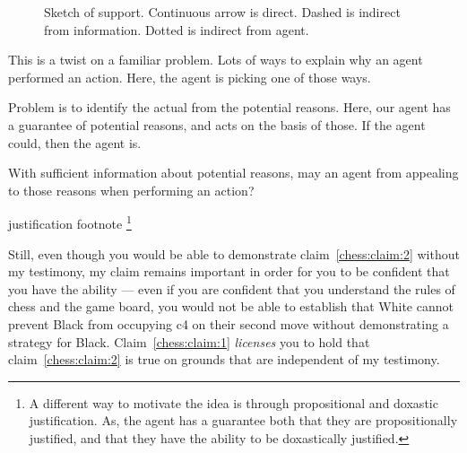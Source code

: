 \documentclass[10pt]{article}
\begin{document}
\begin{figure}[h]
  \centering
\caption{Sketch of support.
  Continuous arrow is direct.
  Dashed is indirect from information.
  Dotted is indirect from agent.}
\label{fig:dynamics}
\end{figure}


\begin{note}
  This is a twist on a familiar problem.
  Lots of ways to explain why an agent performed an action.
  Here, the agent is picking one of those ways.

  Problem is to identify the actual from the potential reasons.
  Here, our agent has a guarantee of potential reasons, and acts on the basis of those.
  If the agent could, then the agent is.

  With sufficient information about potential reasons, may an agent from appealing to those reasons when performing an action?

  justification footnote\nolinebreak
  \footnote{
    A different way to motivate the idea is through propositional and doxastic justification.
    As, the agent has a guarantee both that they are propositionally justified, and that they have the ability to be doxastically justified.
  }
\end{note}

Still, even though you would be able to demonstrate claim~\ref{chess:claim:2} without my testimony, my claim remains important in order for you to be confident that you have the ability --- even if you are confident that you understand the rules of chess and the game board, you would not be able to establish that White cannot prevent Black from occupying c4 on their second move without demonstrating a strategy for Black.
Claim~\ref{chess:claim:1} \emph{licenses} you to hold that claim~\ref{chess:claim:2} is true on grounds that are independent of my testimony.
\end{document}
